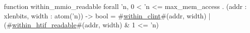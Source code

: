 function within_mmio_readable forall 'n, 0 < 'n <= max_mem_access . (addr : xlenbits, width : atom('n)) -> bool =
  #\hyperref[sailRISCVzwithinzyclint]{within\_clint}#(addr, width) | (#\hyperref[sailRISCVzwithinzyhtifzyreadable]{within\_htif\_readable}#(addr, width) & 1 <= 'n)
